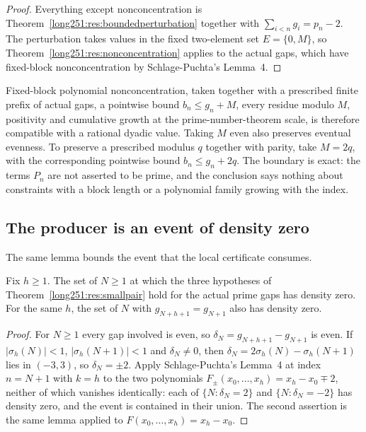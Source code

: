 \begin{proof}
Everything except nonconcentration is Theorem~\ref{long251:res:boundedperturbation}
together with $\sum_{i<n}g_i=p_n-2$.  The perturbation takes values in the
fixed two-element set $E=\{0,M\}$, so Theorem~\ref{long251:res:nonconcentration}
applies to the actual gaps, which have fixed-block nonconcentration by
Schlage-Puchta's Lemma~4.
\end{proof}

Fixed-block polynomial nonconcentration, taken together with a prescribed
finite prefix of actual gaps, a pointwise bound $b_n\le g_n+M$, every residue
modulo $M$, positivity and cumulative growth at the prime-number-theorem scale,
is therefore compatible with a rational dyadic value.  Taking $M$ even also
preserves eventual evenness.  To preserve a prescribed modulus $q$ together
with parity, take $M=2q$, with the corresponding pointwise bound
$b_n\le g_n+2q$.  The boundary is exact: the terms $P_n$ are not asserted to be prime,
and the conclusion says nothing about constraints with a block length or a
polynomial family growing with the index.

\subsection{The producer is an event of density zero}

The same lemma bounds the event that the local certificate consumes.

\begin{theorem}\label{long251:res:sparse}
Fix $h\ge1$.  The set of $N\ge1$ at which the three hypotheses of
Theorem~\ref{long251:res:smallpair} hold for the actual prime gaps has density zero.
For the same $h$, the set of $N$ with $g_{N+h+1}=g_{N+1}$ also has density
zero.
\end{theorem}

\begin{proof}
For $N\ge1$ every gap involved is even, so $\delta_N=g_{N+h+1}-g_{N+1}$ is
even.  If $|\sigma_h(N)|<1$, $|\sigma_h(N+1)|<1$ and $\delta_N\ne0$, then
$\delta_N=2\sigma_h(N)-\sigma_h(N+1)$ lies in $(-3,3)$, so $\delta_N=\pm2$.
Apply Schlage-Puchta's Lemma~4 at index $n=N+1$ with $k=h$ to the two
polynomials $F_\pm(x_0,\ldots,x_h)=x_h-x_0\mp2$, neither of which vanishes
identically: each of $\{N:\delta_N=2\}$ and $\{N:\delta_N=-2\}$ has density
zero, and the event is contained in their union.  The second assertion is the
same lemma applied to $F(x_0,\ldots,x_h)=x_h-x_0$.
\end{proof}


